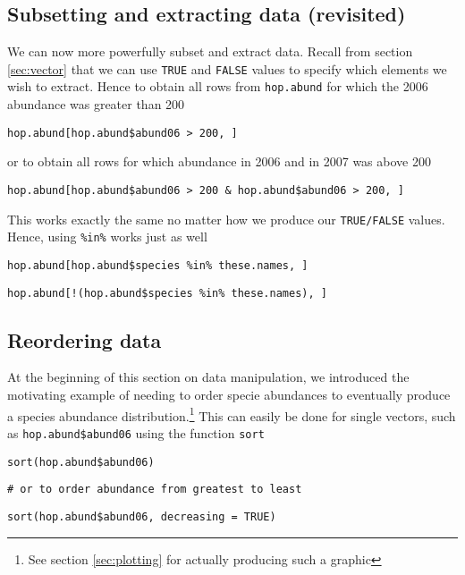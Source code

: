 \documentclass[12pt]{article}
\newcommand{\R}[1] {
	\item \texttt{#1}
}
\newenvironment{verbatim}{ 
	\indent
	\begin{list}{}{\setlength{\itemsep}{-1.5mm}}
}{
	\end{list}
}
\begin{document}
\subsection{Subsetting and extracting data (revisited)}
We can now more powerfully subset and extract data.  Recall from section \ref{sec:vector} that we can use \verb+TRUE+ and \verb+FALSE+ values to specify which elements we wish to extract.  Hence to obtain all rows from \verb+hop.abund+ for which the 2006 abundance was greater than 200
\begin{verbatim}
	\R{hop.abund[hop.abund\$abund06 > 200, ]}
\end{verbatim}
or to obtain all rows for which abundance in 2006 and in 2007 was above 200
\begin{verbatim}
	\R{hop.abund[hop.abund\$abund06 > 200 \& hop.abund\$abund06 > 200, ]}
\end{verbatim}
This works exactly the same no matter how we produce our \verb+TRUE/FALSE+ values.  Hence, using \texttt{\%in\%} works just as well
\begin{verbatim}
	\R{hop.abund[hop.abund\$species \%in\% these.names, ]}
	\R{hop.abund[!(hop.abund\$species \%in\% these.names), ]}
\end{verbatim}

\subsection{Reordering data}
At the beginning of this section on data manipulation, we introduced the motivating example of needing to order specie abundances to eventually produce a species abundance distribution.\footnote{See section \ref{sec:plotting} for actually producing such a graphic}  This can easily be done for single vectors, such as \verb+hop.abund$abund06+ using the function \verb+sort+
\begin{verbatim}
	\R{sort(hop.abund\$abund06)}
	\R{\# or to order abundance from greatest to least}
	\R{sort(hop.abund\$abund06, decreasing = TRUE)}
\end{verbatim}
\end{document}
